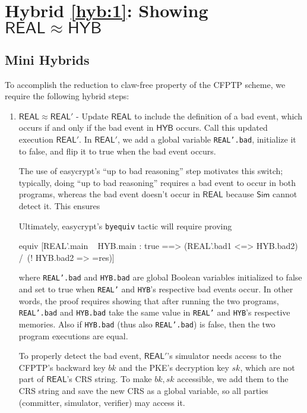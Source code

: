 \documentclass{article}[12pt]
\newcommand{\code}[1]{\texttt{#1}} %
\newcommand{\DecKey}{{sk}}
\newcommand{\BackKey}{{bk}}
\newcommand{\Simulator}{{\mathsf{Sim}}} %
\newcommand{\Hyb}{{\mathsf{HYB}}}
\newcommand{\Real}{{\mathsf{REAL}}}
\begin{document}
\section{Hybrid \ref{hyb:1}: Showing $\Real \approx \Hyb$}

\subsection{Mini Hybrids}
To accomplish the reduction to claw-free property of the CFPTP scheme, we require the following hybrid steps:
\begin{enumerate}
	\item\label{hyb:1.1} $\Real \approx \Real'$ - Update $\Real$ to include the definition of a bad event, which occurs if and only if the bad event in $\Hyb$ occurs. Call this updated execution $\Real'$. In $\Real'$, we add a global variable \code{REAL'.bad}, initialize it to false, and flip it to true when the bad event occurs.

	The use of easycrypt's ``up to bad reasoning'' step motivates this switch; typically, doing ``up to bad reasoning'' requires a bad event to occur in both programs, whereas the bad event doesn't occur in $\Real$ because $\Simulator$ cannot detect it. This ensures

	Ultimately, easycrypt's \code{byequiv} tactic will require proving

\begin{easycrypt}[label=code:real'_equiv_hyb, caption=Claim required to utilize ``up to bad reasoning'']
equiv [REAL'.main ~ HYB.main : true ==> (REAL'.bad{1} <=> HYB.bad{2}) /\ (! HYB.bad{2} => ={res})]
\end{easycrypt}

	where \code{REAL'.bad} and \code{HYB.bad} are global Boolean variables initialized to false and set to true when \code{REAL'} and \code{HYB}'s respective bad events occur. In other words, the proof requires showing that after running the two programs, \code{REAL'.bad} and \code{HYB.bad} take the same value in \code{REAL'} and \code{HYB}'s respective memories. Also if \code{HYB.bad} (thus also \code{REAL'.bad}) is false, then the two program executions are equal.

	To properly detect the bad event, $\Real'$'s simulator needs access to the CFPTP's backward key $\BackKey$ and the PKE's decryption key $\DecKey$, which are not part of $\Real$'s CRS string. To make $\BackKey, \DecKey$ accessible, we add them to the CRS string and save the new CRS as a global variable, so all parties (committer, simulator, verifier) may access it.


\end{enumerate}
\end{document}
